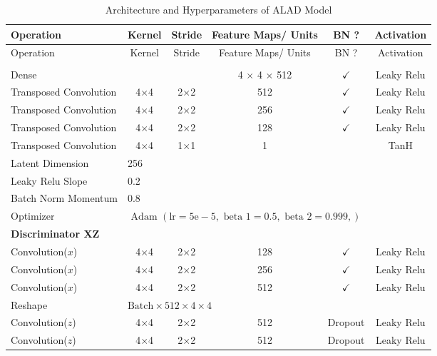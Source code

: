 \footnotesize
\begin{longtable}[c]{@{}lccccc@{}}
	\caption{Architecture and Hyperparameters of ALAD Model}
	\label{tab:alad_imp}\\
	\toprule
	Operation & Kernel & Stride & Feature Maps/ Units & BN ? & Activation \\* \midrule
	\endfirsthead
	\toprule
	Operation & Kernel & Stride & Feature Maps/ Units & BN ? & Activation \\* \midrule
	\endhead
	\bottomrule
	\endfoot
	\endlastfoot
	\multicolumn{6}{l}{\textbf{Generator}} \\
	Dense & \multicolumn{1}{c}{} &  & 4 $\times$ 4 $\times$ 512 & $\checkmark$ & Leaky Relu \\
	Transposed Convolution & \multicolumn{1}{c}{4$\times$4} & 2$\times$2 & 512 & $\checkmark$ & Leaky Relu \\
	Transposed Convolution & \multicolumn{1}{c}{4$\times$4} & 2$\times$2 & 256 & $\checkmark$ & Leaky Relu \\
	Transposed Convolution & \multicolumn{1}{c}{4$\times$4} & 2$\times$2 & 128 & $\checkmark$ & Leaky Relu \\
	Transposed Convolution & \multicolumn{1}{c}{4$\times$4} & 1$\times$1 & 1 &  & TanH \\ \hline
	Latent Dimension & \multicolumn{5}{l}{256} \\
	Leaky Relu Slope & \multicolumn{5}{l}{0.2} \\
	Batch Norm Momentum & \multicolumn{5}{l}{0.8} \\
	Optimizer & \multicolumn{5}{l}{$\text { Adam }(\mathrm{lr}=5 \mathrm{e}-5, \text { beta } 1=0.5, \text { beta } 2=0.999,)$} \\ \hline
	\multicolumn{6}{l}{\textbf{Discriminator XZ}} \\
	Convolution($x$) & \multicolumn{1}{c}{4$\times$4} & 2$\times$2 & 128 & $\checkmark$ & Leaky Relu \\
	Convolution($x$) & \multicolumn{1}{c}{4$\times$4} & 2$\times$2 & 256 & $\checkmark$ & Leaky Relu \\
	Convolution($x$) & \multicolumn{1}{c}{4$\times$4} & 2$\times$2 & 512 & $\checkmark$ & Leaky Relu \\
	Reshape & \multicolumn{5}{l}{$\text{Batch} \times 512 \times 4 \times 4$} \\
	Convolution($z$) & \multicolumn{1}{c}{4$\times$4} & 2$\times$2 & 512 & Dropout & Leaky Relu \\
	Convolution($z$) & \multicolumn{1}{c}{4$\times$4} & 2$\times$2 & 512 & Dropout & Leaky Relu \\

\end{longtable}
